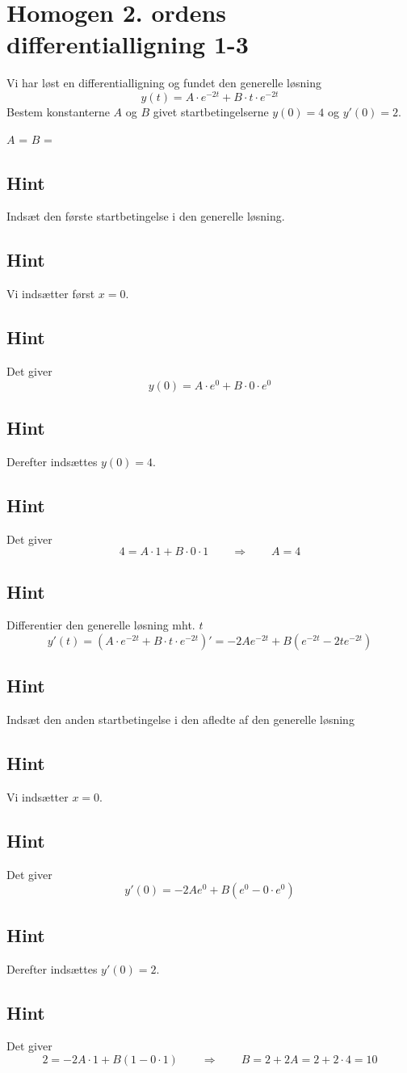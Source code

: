 \documentclass{article}
\newenvironment{exercise}[1]{\newpage\section{#1}}{}
\newcommand{\answerbox}[1]{\fbox{$#1$}}
\newcommand{\hint}{\subsection*{Hint}}
\begin{document}
\begin{exercise}{Homogen 2. ordens differentialligning 1-3}
	
Vi har løst en differentialligning og fundet den generelle løsning
\[
y(t) = A \cdot e^{-2t} + B \cdot t \cdot e^{-2t}
\]
Bestem konstanterne $A$ og $B$ givet startbetingelserne $y(0)=4$ og $y'(0)=2$.


$A$ = \answerbox{4}		
$B$ = \answerbox{10}

\hint

Indsæt den første startbetingelse i den generelle løsning. 


\hint

Vi indsætter først $x=0$.

\hint

Det giver
\[
y(0)=  A \cdot e^{0} + B \cdot 0 \cdot e^{0}
\]

\hint

Derefter indsættes $y(0)=4$.

\hint 

Det giver 
\[
4 = A \cdot 1 + B \cdot 0 \cdot 1 \qquad \Rightarrow \qquad A = 4
\]

\hint 

Differentier den generelle løsning mht. $t$
\[
y'(t)= \left(A \cdot e^{-2t} + B \cdot t \cdot e^{-2t} \right)' = -2A e^{-2t} + B \left( e^{-2t} -2 t e^{-2t} \right)
\]

\hint 

Indsæt den anden startbetingelse i den afledte af den generelle løsning

\hint

Vi indsætter $x=0$.

\hint 

Det giver
\[
y'(0) = -2A e^{0} + B \left( e^{0} - 0 \cdot e^{0} \right)
\]

\hint 

Derefter indsættes $y'(0)=2$.

\hint

Det giver
\[
2 = -2A \cdot 1 + B \left(1- 0 \cdot 1 \right) \qquad \Rightarrow \qquad B = 2 + 2A = 2 + 2 \cdot 4 = 10
\]

	
\end{exercise}

\newpage
\end{document}
